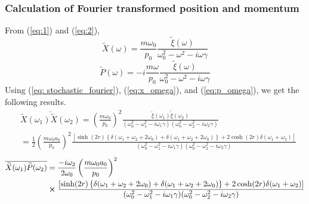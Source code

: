 \documentclass[12pt, twoside]{article}
\begin{document}
\subsubsection{Calculation of Fourier transformed position and momentum}
From (\ref{eq:1}) and (\ref{eq:2}), \begin{equation}\label{eq:x_omega}
\widetilde{X}(\omega) = \frac{m \omega_0}{p_0} \frac { \widetilde { \xi } ( \omega ) } { \omega _ { 0 } ^ { 2 } - \omega ^ { 2 } - i \omega \gamma }
\end{equation}
\begin{equation}\label{eq:p_omega}
\widetilde{P}(\omega) = -i\frac{m \omega}{p_0} \frac { \widetilde { \xi } ( \omega ) } { \omega _ { 0 } ^ { 2 } - \omega ^ { 2 } - i \omega \gamma }
\end{equation}
Using (\ref{eq: stochastic_fourier}), (\ref{eq:x_omega}), and (\ref{eq:p_omega}), we get the following results.
\begin{equation}\label{eq:x_corr_fourier}
\begin{aligned} &\overline{\widetilde { X } ( \omega_1 )\widetilde { X } ( \omega_2 )} = \left(\frac { m \omega _ { 0 } } { p _ { 0 } }\right)^2 \frac {\overline{ \widetilde { \xi } ( \omega_1 )\widetilde { \xi } ( \omega_2 ) }} {( \omega _ { 0 } ^ { 2 } - \omega_1 ^ { 2 } - i \omega_1 \gamma)(\omega _ { 0 } ^ { 2 } - \omega_2 ^ { 2 } - i \omega_2 \gamma) }
\\ & = \frac{1}{2} \left(\frac { m \omega _ { 0 } a_0 } { p _ { 0 } }\right)^2 \frac{\left[\sinh(2r)\left\{\delta(\omega_1 + \omega_2 + 2\omega_0)+\delta(\omega_1 + \omega_2 + 2\omega_0)\right\} + 2\cosh(2r)\delta(\omega_1 + \omega_2)\right]}{( \omega _ { 0 } ^ { 2 } - \omega_1 ^ { 2 } - i \omega_1 \gamma)(\omega _ { 0 } ^ { 2 } - \omega_2 ^ { 2 } - i \omega_2 \gamma)}
\end{aligned}
\end{equation}
\begin{equation}\begin{aligned}
\overline{\widetilde { X } ( \omega_1 )\widetilde { P } ( \omega_2 )} & = \frac{-i\omega_2}{2\omega_0} \left(\frac { m \omega_0 a_0 } { p _ { 0 } }\right)^2 \\&\cross \frac{\left[\sinh(2r)\left\{\delta(\omega_1 + \omega_2 + 2\omega_0)+\delta(\omega_1 + \omega_2 + 2\omega_0)\right\} + 2\cosh(2r)\delta(\omega_1 + \omega_2)\right]}{( \omega _ { 0 } ^ { 2 } - \omega_1 ^ { 2 } - i \omega_1 \gamma)(\omega _ { 0 } ^ { 2 } - \omega_2 ^ { 2 } - i \omega_2 \gamma)} \end{aligned}
\end{equation}
\end{document}

